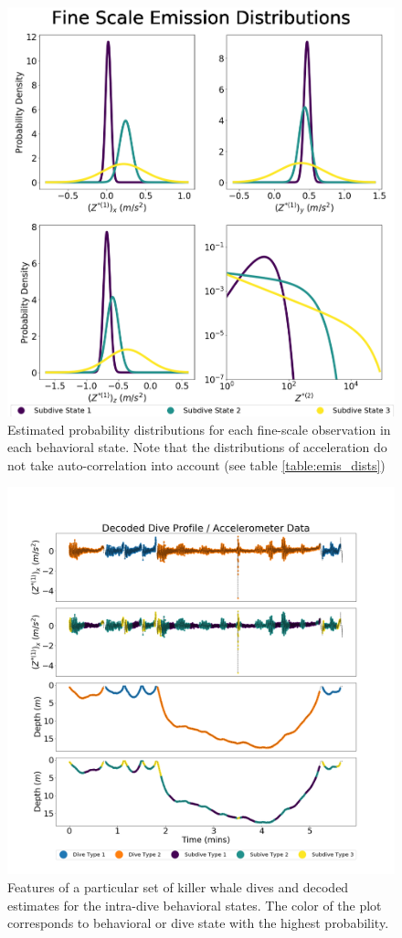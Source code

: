 \begin{figure}[ht]
	\centering
	\includegraphics[width=5in]{../Plots/CarHHMM2-fine-emissions.png}
	\caption{Estimated probability distributions for each fine-scale observation in each behavioral state. Note that the distributions of acceleration do not take auto-correlation into account (see table \ref{table:emis_dists})}
	\label{fig:fine_emis}
\end{figure}

\begin{figure}[ht]
	\centering
	\includegraphics[width=5in]{../Plots/CarHHMM2_decoded_dives.png}
	\caption{Features of a particular set of killer whale dives and decoded estimates for the intra-dive behavioral states. The color of the plot corresponds to behavioral or dive state with the highest probability.}
	\label{fig:labeled_dives}
\end{figure}


